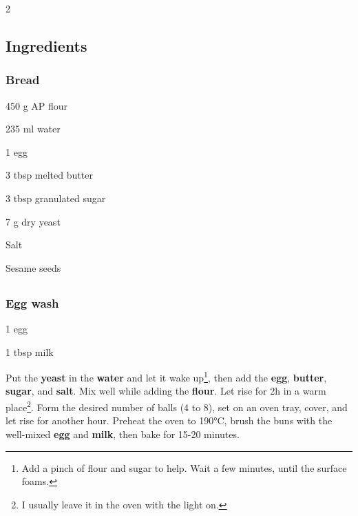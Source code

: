 \newpage
{}

\begin{multicols}{2}
	\subsection*{Ingredients}
	\subsubsection*{Bread}
	\begin{ingredients}
		\item 450 g AP flour
		\item 235 ml water
		\item 1 egg
		\item 3 tbsp melted butter
		\item 3 tbsp granulated sugar
		\item 7 g dry yeast
		\item Salt
		\item Sesame seeds
	\end{ingredients}
	
		\columnbreak
	\subsection*{}
	\subsubsection*{Egg wash}
	\begin{ingredients}
		\item 1 egg
		\item 1 tbsp milk
	\end{ingredients}
\end{multicols}

\medskip

Put the \textbf{yeast} in the \textbf{water} and let it wake up\footnote{Add a pinch of flour and sugar to help. Wait a few minutes, until the surface foams.}, then add the \textbf{egg}, \textbf{butter}, \textbf{sugar}, and \textbf{salt}. Mix well while adding the \textbf{flour}. 
Let rise for 2h in a warm place\footnote{I usually leave it in the oven with the light on.}. 
Form the desired number of balls (4 to 8), set on an oven tray, cover, and let rise for another hour. 
Preheat the oven to 190°C, brush the buns with the well-mixed \textbf{egg} and \textbf{milk}, then bake for 15-20 minutes.


\vspace*{0.75 cm}

\begin{recipeblock}
	
\end{recipeblock}
